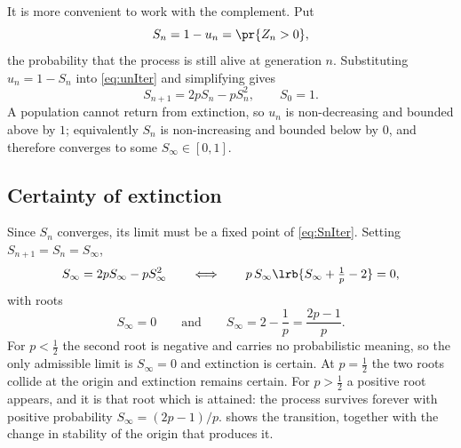 It is more convenient to work with the complement. Put
\begin{equation*}
S_n = 1-u_n = \pr{Z_n>0},
\end{equation*}
the probability that the process is still alive at generation $n$. Substituting
$u_n = 1-S_n$ into \cref{eq:unIter} and simplifying gives
\begin{equation}
\label{eq:SnIter}
S_{n+1} = 2pS_n - pS_n^2,\qquad S_0 = 1 .
\end{equation}
A population cannot return from extinction, so $u_n$ is non-decreasing and bounded
above by $1$; equivalently $S_n$ is non-increasing and bounded below by $0$, and
therefore converges to some $S_\infty\in[0,1]$.

\subsection{Certainty of extinction}
\label{sec:certainty}

Since $S_n$ converges, its limit must be a fixed point of \cref{eq:SnIter}. Setting
$S_{n+1}=S_n=S_\infty$,
\begin{equation*}
S_\infty = 2pS_\infty - pS_\infty^2
\qquad\Longleftrightarrow\qquad
p\,S_\infty\lrb{S_\infty + \tfrac1p - 2} = 0 ,
\end{equation*}
with roots
\begin{equation*}
S_\infty = 0
\qquad\text{and}\qquad
S_\infty = 2-\frac1p = \frac{2p-1}{p} .
\end{equation*}
For $p<\tfrac12$ the second root is negative and carries no probabilistic meaning,
so the only admissible limit is $S_\infty=0$ and extinction is certain. At
$p=\tfrac12$ the two roots collide at the origin and extinction remains certain.
For $p>\tfrac12$ a positive root appears, and it is that root which is attained:
the process survives forever with positive probability
$S_\infty = (2p-1)/p$.  shows the transition, together
with the change in stability of the origin that produces it.

